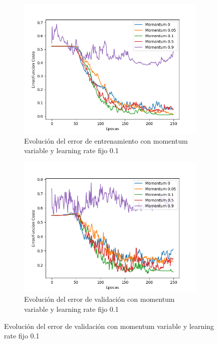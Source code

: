 \begin{figure}[!htbp]
\centering
\begin{subfigure}{.5\textwidth}
  \centering
  \includegraphics[width=1\linewidth]{graficos/eta_x_momentum_promedios_entrenamiento_0.png}
  \caption{Evolución del error de entrenamiento con momentum variable y learning rate fijo 0.1}
  \label{fig:sub1}
\end{subfigure}%
\begin{subfigure}{.5\textwidth}
  \centering
  \includegraphics[width=1\linewidth]{graficos/eta_x_momentum_promedios_validacion_0.png}
  \caption{Evolución del error de validación con momentum variable y learning rate fijo 0.1}
  \label{fig:sub2}
\end{subfigure}
\end{figure}

